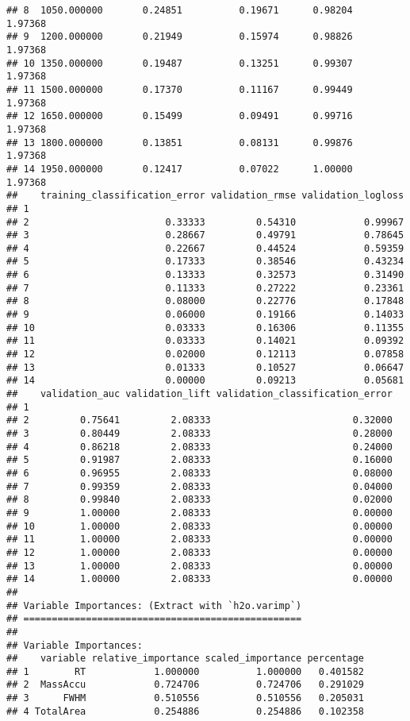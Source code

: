 \documentclass[]{article}
\begin{document}
\begin{verbatim}
## 8  1050.000000       0.24851          0.19671      0.98204       1.97368
## 9  1200.000000       0.21949          0.15974      0.98826       1.97368
## 10 1350.000000       0.19487          0.13251      0.99307       1.97368
## 11 1500.000000       0.17370          0.11167      0.99449       1.97368
## 12 1650.000000       0.15499          0.09491      0.99716       1.97368
## 13 1800.000000       0.13851          0.08131      0.99876       1.97368
## 14 1950.000000       0.12417          0.07022      1.00000       1.97368
##    training_classification_error validation_rmse validation_logloss
## 1                                                                  
## 2                        0.33333         0.54310            0.99967
## 3                        0.28667         0.49791            0.78645
## 4                        0.22667         0.44524            0.59359
## 5                        0.17333         0.38546            0.43234
## 6                        0.13333         0.32573            0.31490
## 7                        0.11333         0.27222            0.23361
## 8                        0.08000         0.22776            0.17848
## 9                        0.06000         0.19166            0.14033
## 10                       0.03333         0.16306            0.11355
## 11                       0.03333         0.14021            0.09392
## 12                       0.02000         0.12113            0.07858
## 13                       0.01333         0.10527            0.06647
## 14                       0.00000         0.09213            0.05681
##    validation_auc validation_lift validation_classification_error
## 1                                                                
## 2         0.75641         2.08333                         0.32000
## 3         0.80449         2.08333                         0.28000
## 4         0.86218         2.08333                         0.24000
## 5         0.91987         2.08333                         0.16000
## 6         0.96955         2.08333                         0.08000
## 7         0.99359         2.08333                         0.04000
## 8         0.99840         2.08333                         0.02000
## 9         1.00000         2.08333                         0.00000
## 10        1.00000         2.08333                         0.00000
## 11        1.00000         2.08333                         0.00000
## 12        1.00000         2.08333                         0.00000
## 13        1.00000         2.08333                         0.00000
## 14        1.00000         2.08333                         0.00000
## 
## Variable Importances: (Extract with `h2o.varimp`) 
## =================================================
## 
## Variable Importances: 
##    variable relative_importance scaled_importance percentage
## 1        RT            1.000000          1.000000   0.401582
## 2  MassAccu            0.724706          0.724706   0.291029
## 3      FWHM            0.510556          0.510556   0.205031
## 4 TotalArea            0.254886          0.254886   0.102358
\end{verbatim}
\end{document}
